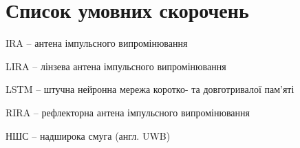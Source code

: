 \section*{Список умовних скорочень}


IRA -- антена імпульсного випромінювання

LIRA -- лінзева антена імпульсного випромінювання

LSTM -- штучна нейронна мережа коротко- та довготривалої пам'яті

RIRA -- рефлекторна антена імпульсного випромінювання

НШС -- надширока смуга (англ. UWB)




